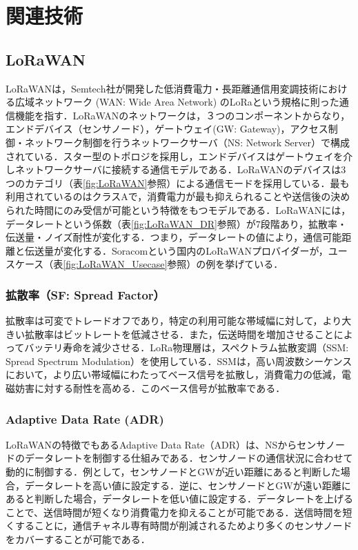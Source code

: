 \chapter{関連技術}

\section{LoRaWAN}
LoRaWANは，Semtech社が開発した低消費電力・長距離通信用変調技術における広域ネットワーク (WAN: Wide Area Network) のLoRaという規格に則った通信機能を指す．LoRaWANのネットワークは，３つのコンポーネントからなり，エンドデバイス（センサノード），ゲートウェイ(GW: Gateway)，アクセス制御・ネットワーク制御を行うネットワークサーバ（NS: Network Server）で構成されている．スター型のトポロジを採用し，エンドデバイスはゲートウェイを介しネットワークサーバに接続する通信モデルである．LoRaWANのデバイスは3つのカテゴリ（表\ref{fig:LoRaWAN}参照）による通信モードを採用している．最も利用されているのはクラスAで，消費電力が最も抑えられることや送信後の決められた時間にのみ受信が可能という特徴をもつモデルである．LoRaWANには，データレートという係数（表\ref{fig:LoRaWAN_DR}参照）が7段階あり，拡散率・伝送量・ノイズ耐性が変化する．つまり，データレートの値により，通信可能距離と伝送量が変化する．Soracomという国内のLoRaWANプロバイダーが，ユースケース（表\ref{fig:LoRaWAN_Usecase}参照）の例を挙げている\cite{lorawanbysoracom}．

\subsection{拡散率（SF: Spread Factor）}
拡散率は可変でトレードオフであり，特定の利用可能な帯域幅に対して，より大きい拡散率はビットレートを低減させる．また，伝送時間を増加させることによってバッテリ寿命を減少させる．LoRa物理層は，スペクトラム拡散変調（SSM: Spread Spectrum Modulation）を使用している．SSMは，高い周波数シーケンスにおいて，より広い帯域幅にわたってベース信号を拡散し，消費電力の低減，電磁妨害に対する耐性を高める．このベース信号が拡散率である．

\subsection{Adaptive Data Rate (ADR)}
LoRaWANの特徴でもあるAdaptive Data Rate（ADR）は、NSからセンサノードのデータレートを制御する仕組みである．センサノードの通信状況に合わせて動的に制御する．例として，センサノードとGWが近い距離にあると判断した場合，データレートを高い値に設定する．逆に、センサノードとGWが遠い距離にあると判断した場合，データレートを低い値に設定する．データレートを上げることで、送信時間が短くなり消費電力を抑えることが可能である．送信時間を短くすることに，通信チャネル専有時間が削減されるためより多くのセンサノードをカバーすることが可能である．

